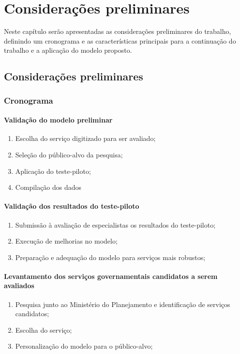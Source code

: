 \chapter[Considerações preliminares]{Considerações preliminares}
Neste capítulo serão apresentadas as considerações preliminares do trabalho, definindo um cronograma e as características principais para a continuação do trabalho e a aplicação do modelo proposto.
\section{Considerações preliminares}
	\subsection{Cronograma}
		\subsubsection{Validação do modelo preliminar}
			\begin{enumerate}
				\item Escolha do serviço digitizado para ser avaliado;
				\item Seleção do público-alvo da pesquisa;
				\item Aplicação do teste-piloto;
				\item Compilação dos dados
			\end{enumerate}
		\subsubsection{Validação dos resultados do teste-piloto}
			\begin{enumerate}
				\item Submissão à avaliação de especialistas os resultados do teste-piloto;
				\item Execução de melhorias no modelo;
				\item Preparação e adequação do modelo para serviços mais robustos;
			\end{enumerate}
		\subsubsection{Levantamento dos serviços governamentais candidatos a serem avaliados}
			\begin{enumerate}
				\item Pesquisa junto ao Ministério do Planejamento e identificação de serviços candidatos;
				\item Escolha do serviço;
				\item Personalização do modelo para o público-alvo;
			\end{enumerate}
